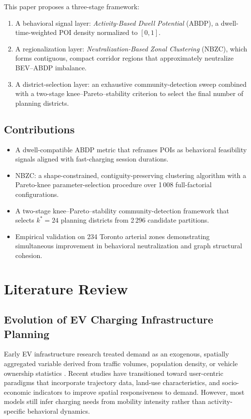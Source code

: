 \documentclass[conference]{IEEEtran}
\begin{document}
This paper proposes a three-stage framework:
\begin{enumerate}[label=(\roman*)]
  \item A behavioral signal layer: \emph{Activity-Based Dwell Potential}
        (ABDP), a dwell-time-weighted POI density normalized to $[0,1]$.
  \item A regionalization layer: \emph{Neutralization-Based Zonal
        Clustering} (NBZC), which forms contiguous, compact corridor
        regions that approximately neutralize BEV--ABDP imbalance.
  \item A district-selection layer: an exhaustive community-detection
        sweep combined with a two-stage knee--Pareto--stability criterion
        to select the final number of planning districts.
\end{enumerate}

\subsection{Contributions}
\begin{itemize}
  \item A dwell-compatible ABDP metric that reframes POIs as behavioral
        feasibility signals aligned with fast-charging session durations.
  \item NBZC: a shape-constrained, contiguity-preserving clustering
        algorithm with a Pareto-knee parameter-selection procedure over
        1\,008 full-factorial configurations.
  \item A two-stage knee--Pareto--stability community-detection
        framework that selects $k^*=24$ planning districts from
        2\,296 candidate partitions.
  \item Empirical validation on 234 Toronto arterial zones demonstrating
        simultaneous improvement in behavioral neutralization and graph
        structural cohesion.
\end{itemize}

\section{Literature Review}

\subsection{Evolution of EV Charging Infrastructure Planning}
Early EV infrastructure research treated demand as an exogenous,
spatially aggregated variable derived from traffic volumes, population
density, or vehicle ownership statistics \cite{BIAN2022}.
Recent studies have transitioned toward user-centric paradigms that
incorporate trajectory data, land-use characteristics, and
socio-economic indicators to improve spatial responsiveness to demand.
However, most models still infer charging needs from mobility intensity
rather than activity-specific behavioral dynamics.
\end{document}
